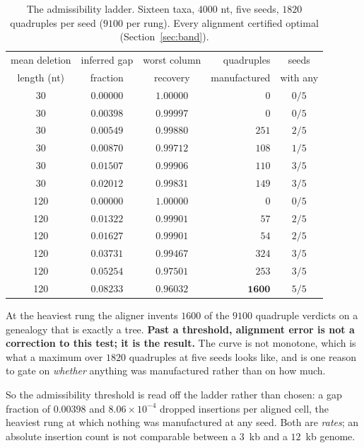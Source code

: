 \documentclass[11pt,a4paper]{article}
\theoremstyle{definition}
\theoremstyle{remark}
\begin{document}
\begin{table}[t]
\centering\small
\caption{The admissibility ladder. Sixteen taxa, $4000$ nt, five seeds, $1820$
quadruples per seed ($9100$ per rung). Every alignment certified optimal
(Section~\ref{sec:band}).}
\label{tab:ladder}
\begin{tabular}{@{}cccrc@{}}
\toprule
mean deletion & inferred gap & worst column & quadruples & seeds \\
length (nt) & fraction & recovery & manufactured & with any \\
\midrule
 30 & $0.00000$ & $1.00000$ & $0$    & $0/5$ \\
 30 & $0.00398$ & $0.99997$ & $0$    & $0/5$ \\
 30 & $0.00549$ & $0.99880$ & $251$  & $2/5$ \\
 30 & $0.00870$ & $0.99712$ & $108$  & $1/5$ \\
 30 & $0.01507$ & $0.99906$ & $110$  & $3/5$ \\
 30 & $0.02012$ & $0.99831$ & $149$  & $3/5$ \\
120 & $0.00000$ & $1.00000$ & $0$    & $0/5$ \\
120 & $0.01322$ & $0.99901$ & $57$   & $2/5$ \\
120 & $0.01627$ & $0.99901$ & $54$   & $2/5$ \\
120 & $0.03731$ & $0.99467$ & $324$  & $3/5$ \\
120 & $0.05254$ & $0.97501$ & $253$  & $3/5$ \\
120 & $0.08233$ & $0.96032$ & $\mathbf{1600}$ & $5/5$ \\
\bottomrule
\end{tabular}
\end{table}

At the heaviest rung the aligner invents $1600$ of the $9100$ quadruple verdicts
on a genealogy that is exactly a tree. \textbf{Past a threshold, alignment error
is not a correction to this test; it is the result.} The curve is not monotone,
which is what a maximum over $1820$ quadruples at five seeds looks like, and is
one reason to gate on \emph{whether} anything was manufactured rather than on how
much.

So the admissibility threshold is read off the ladder rather than chosen: a gap
fraction of $0.00398$ and $8.06 \times 10^{-4}$ dropped insertions per aligned
cell, the heaviest rung at which nothing was manufactured at any seed. Both are
\emph{rates}; an absolute insertion count is not comparable between a $3$~kb and
a $12$~kb genome.
\end{document}
